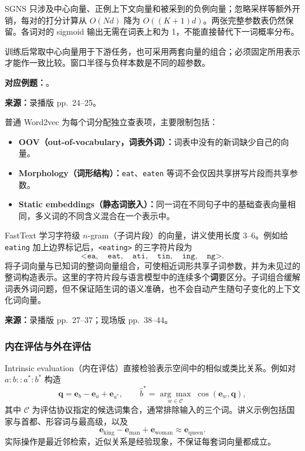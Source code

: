 SGNS 只涉及中心向量、正例上下文向量和被采到的负例向量；忽略采样等额外开销，每对的打分计算从 $O(Nd)$ 降为 $O((K+1)d)$。两张完整参数表仍然保留。各词对的 sigmoid 输出无需在词表上和为 1，不能直接替代下一词概率分布。

训练后常取中心向量用于下游任务，也可采用两套向量的组合；必须固定所用表示才能作一致比较。窗口半径与负样本数是不同的超参数。

\textbf{对应例题：}。

\nopagebreak[4]

\textbf{来源：}录播版 pp.~24--25。
\nopagebreak[4]

普通 Word2vec 为每个词分配独立查表项，主要限制包括：
\begin{itemize}
  \item \textbf{OOV（out-of-vocabulary，词表外词）：}词表中没有的新词缺少自己的向量。
  \item \textbf{Morphology（词形结构）：}\texttt{eat}、\texttt{eaten} 等词不会仅因共享拼写片段而共享参数。
  \item \textbf{Static embeddings（静态词嵌入）：}同一词在不同句子中的基础查表向量相同，多义词的不同含义混合在一个表示中。
\end{itemize}

FastText 学习字符级 $n$-gram（子词片段）的向量，讲义使用长度 3--6。例如给 \texttt{eating} 加上边界标记后，\texttt{<eating>} 的三字符片段为
\[
  \texttt{<ea},\quad\texttt{eat},\quad\texttt{ati},\quad
  \texttt{tin},\quad\texttt{ing},\quad\texttt{ng>}.
\]
将子词向量与已知词的整词向量组合，可使相近词形共享子词参数，并为未见过的整词构造表示。这里的字符片段与语言模型中的连续多个\textbf{词}要区分。子词组合缓解词表外词问题，但不保证陌生词的语义准确，也不会自动产生随句子变化的上下文化词向量。

\nopagebreak[4]

\textbf{来源：}录播版 pp.~27--37；现场版 pp.~38--44。
\nopagebreak[4]

\subsubsection{内在评估与外在评估}

Intrinsic evaluation（内在评估）直接检验表示空间中的相似或类比关系。例如对 $a:b::a^*:b^*$ 构造
\[
  \mathbf q=\mathbf e_b-\mathbf e_a+\mathbf e_{a^*},
  \qquad
  \hat b^*=\underset{w\in\mathcal C}{\arg\max}\;
  \cos(\mathbf e_w,\mathbf q),
\]
其中 $\mathcal C$ 为评估协议指定的候选词集合，通常排除输入的三个词。讲义示例包括国家与首都、形容词与最高级，以及
\[
  \mathbf e_{\mathrm{king}}-\mathbf e_{\mathrm{man}}
  +\mathbf e_{\mathrm{woman}}\approx\mathbf e_{\mathrm{queen}}.
\]
实际操作是最近邻检索，近似关系是经验现象，不保证每套词向量都成立。

